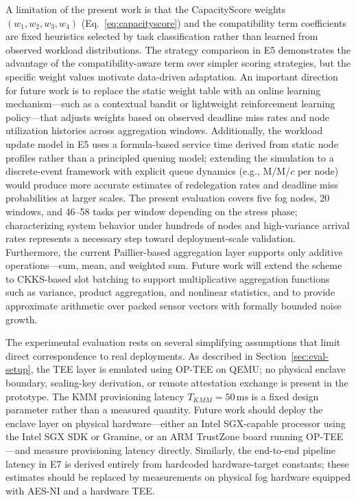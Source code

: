 \documentclass[conference]{IEEEtran}
\begin{document}
    A limitation of the present work is that the CapacityScore weights $(w_1, w_2, w_3, w_4)$ (Eq.~\eqref{eq:capacityscore}) and the compatibility term coefficients are fixed heuristics selected by task classification rather than learned from observed workload distributions. The strategy comparison in E5 demonstrates the advantage of the compatibility-aware term over simpler scoring strategies, but the specific weight values motivate data-driven adaptation. An important direction for future work is to replace the static weight table with an online learning mechanism---such as a contextual bandit or lightweight reinforcement learning policy---that adjusts weights based on observed deadline miss rates and node utilization histories across aggregation windows. Additionally, the workload update model in E5 uses a formula-based service time derived from static node profiles rather than a principled queuing model; extending the simulation to a discrete-event framework with explicit queue dynamics (e.g., M/M/$c$ per node) would produce more accurate estimates of redelegation rates and deadline miss probabilities at larger scales. The present evaluation covers five fog nodes, 20 windows, and 46--58 tasks per window depending on the stress phase; characterizing system behavior under hundreds of nodes and high-variance arrival rates represents a necessary step toward deployment-scale validation. Furthermore, the current Paillier-based aggregation layer supports only additive operations---sum, mean, and weighted sum. Future work will extend the scheme to CKKS-based slot batching to support multiplicative aggregation functions such as variance, product aggregation, and nonlinear statistics, and to provide approximate arithmetic over packed sensor vectors with formally bounded noise growth.

    The experimental evaluation rests on several simplifying assumptions that limit direct correspondence to real deployments. As described in Section~\ref{sec:eval-setup}, the TEE layer is emulated using OP-TEE on QEMU; no physical enclave boundary, sealing-key derivation, or remote attestation exchange is present in the prototype. The KMM provisioning latency $T_{KMM}=50\,\text{ms}$ is a fixed design parameter rather than a measured quantity. Future work should deploy the enclave layer on physical hardware---either an Intel SGX-capable processor using the Intel SGX SDK or Gramine, or an ARM TrustZone board running OP-TEE---and measure provisioning latency directly. Similarly, the end-to-end pipeline latency in E7 is derived entirely from hardcoded hardware-target constants; these estimates should be replaced by measurements on physical fog hardware equipped with AES-NI and a hardware TEE.
\end{document}
